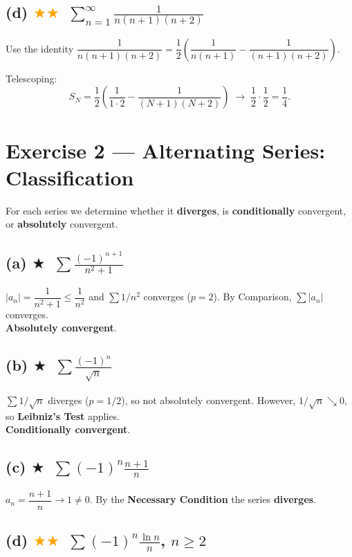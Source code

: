 \documentclass[12pt,a4paper]{article}
\newcommand{\easy}{\textcolor{green!60!black}{$\bigstar$}}
\newcommand{\medium}{\textcolor{orange}{$\bigstar\bigstar$}}
\begin{document}
\subsection*{(d) \medium\ $\displaystyle\sum_{n=1}^{\infty}\frac{1}{n(n+1)(n+2)}$}

Use the identity $\dfrac{1}{n(n+1)(n+2)}=\dfrac{1}{2}\!\left(\dfrac{1}{n(n+1)}-\dfrac{1}{(n+1)(n+2)}\right)$.

Telescoping:
\[
  S_N = \frac{1}{2}\!\left(\frac{1}{1\cdot2}-\frac{1}{(N+1)(N+2)}\right)
  \;\to\; \frac{1}{2}\cdot\frac{1}{2} = \boxed{\frac{1}{4}}.
\]

\section*{Exercise 2 — Alternating Series: Classification}

For each series we determine whether it \textbf{diverges}, is \textbf{conditionally} convergent, or \textbf{absolutely} convergent.

\subsection*{(a) \easy\ $\displaystyle\sum\frac{(-1)^{n+1}}{n^2+1}$}

$|a_n|=\dfrac{1}{n^2+1}\leq\dfrac{1}{n^2}$ and $\sum 1/n^2$ converges ($p=2$). By Comparison, $\sum|a_n|$ converges.\\
\textbf{Absolutely convergent}.

\subsection*{(b) \easy\ $\displaystyle\sum\frac{(-1)^n}{\sqrt{n}}$}

$\sum 1/\sqrt{n}$ diverges ($p=1/2$), so not absolutely convergent.  However, $1/\sqrt{n}\searrow 0$, so \textbf{Leibniz's Test} applies.\\
\textbf{Conditionally convergent}.

\subsection*{(c) \easy\ $\displaystyle\sum(-1)^n\frac{n+1}{n}$}

$a_n = \dfrac{n+1}{n}\to 1\neq 0$. By the \textbf{Necessary Condition} the series \textbf{diverges}.

\subsection*{(d) \medium\ $\displaystyle\sum(-1)^n\frac{\ln n}{n}$, $n\geq 2$}
\end{document}
